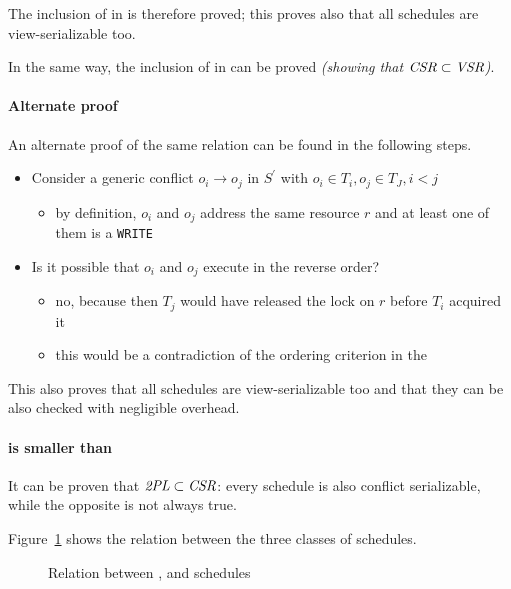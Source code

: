 \documentclass[english]{article}
\begin{document}
The inclusion of \TPL in \CSR is therefore proved;
this proves also that all \TPL schedules are view-serializable too.

In the same way, the inclusion of \TPL in \VSR can be proved \textit{(showing that \(\textit{CSR} \subset \textit{VSR}\))}.

\paragraph{Alternate proof}

An alternate proof of the same relation can be found in the following steps.

\begin{itemize}
  \item Consider a generic conflict \(o_i \rightarrow o_j\) in \(S^\prime\) with \(o_i \in T_i, o_j \in T_J, i < j\)
        \begin{itemize}
          \item by definition, \(o_i\) and \(o_j\) address the same resource \(r\) and at least one of them is a \texttt{WRITE}
        \end{itemize}
  \item Is it possible that \(o_i\) and \(o_j\) execute in the reverse order?
        \begin{itemize}
          \item no, because then \(T_j\) would have released the lock on \(r\) before \(T_i\) acquired it
          \item this would be a contradiction of the ordering criterion in the \TPL
        \end{itemize}
\end{itemize}

\bigskip
This also proves that all \TPL schedules are view-serializable too and that they can be also checked with negligible overhead.

\paragraph{\TPL is smaller than \CSR}

It can be proven that \(\textit{2PL} \subset \textit{CSR}\): every \TPL schedule is also conflict serializable, while the opposite is not always true.

\bigskip
Figure~\ref{fig:relation-between-tpl-csr-vsr-schedules} shows the relation between the three classes of schedules.

\begin{figure}[htbp]
  \centering
  \bigskip
  \caption{Relation between \TPL, \CSR and \VSR schedules}
  \label{fig:relation-between-tpl-csr-vsr-schedules}
  \bigskip
\end{figure}
\end{document}
